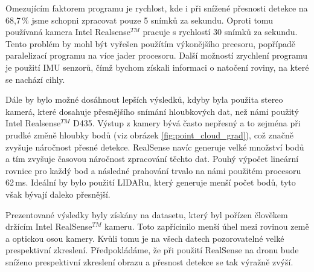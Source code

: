 \documentclass[twoside]{ctuthesis}
\begin{document}
Omezujícím faktorem programu je rychlost, kde i při snížené přesnosti detekce na 68,7\,\% jsme schopni zpracovat pouze 5 snímků za sekundu. Oproti tomu používaná kamera Intel\textregistered{} Realsense$^{TM}$ pracuje s rychlostí 30 snímků za sekundu. Tento problém by mohl být vyřešen použítím výkonějšího prcesoru, popřípadě paralelizací programu na více jader procesoru. Další možností zrychlení programu je použití IMU senzorů, čímž bychom získali informaci o natočení roviny, na které se nachází cihly.

Dále by bylo možné dosáhnout lepších výsledků, kdyby byla použita stereo kamerá, které dosahuje přesnějšího snímání hloubkových dat, než námi použitý Intel\textregistered{} Realsense$^{TM}$ D435. Výstup z kamery bývá často nepřesný a to zejména při prudké změně hloubky bodů (viz obrázek \ref{fig:point_cloud_grad}), což značně zvyšuje náročnost přesné detekce. RealSense navíc generuje velké množství bodů a tím zvyšuje časovou náročnost zpracování těchto dat. Pouhý výpočet lineární rovnice pro každý bod a následné prahování trvalo na námi použitém procesoru 62\,ms. Ideální by bylo použití LIDARu, který generuje menší počet bodů, tyto však bývají daleko přesnější.

Prezentované výsledky byly získány na datasetu, který byl pořízen člověkem držícím Intel\textregistered{}  RealSense$^{TM}$ kameru. Toto zapřícinilo menší úhel mezi rovinou země a optickou osou kamery. Kvůli tomu je na všech datech pozorovatelné velké prespektivní zkreslení. Předpokládáme, že při použití RealSense na dronu bude sníženo prespektivní zkreslení obrazu a přesnost detekce se tak výražně zvýší.




\end{document}
